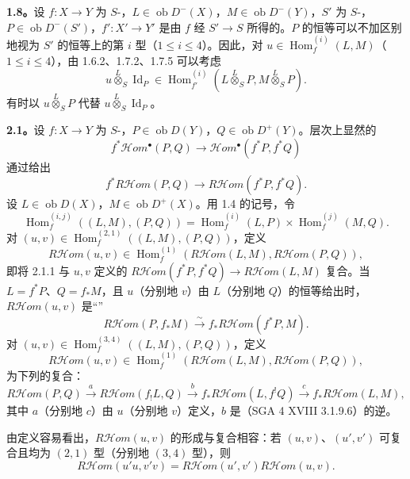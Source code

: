 \textbf{1.8。}设 $f:X\to Y$ 为 $S$-，$L\in\operatorname{ob}D^-(X)$，$M\in\operatorname{ob}D^-(Y)$，$S'$ 为 $S$-，$P\in\operatorname{ob}D^-(S')$，$f':X'\to Y'$ 是由 $f$ 经 $S'\to S$ 所得的。$P$ 的恒等可以不加区别地视为 $S'$ 的恒等上的第 $i$ 型（$1\le i\le4$）。因此，对 $u\in\operatorname{Hom}^{(i)}_f(L,M)$（$1\le i\le4$），由 1.6.2、1.7.2、1.7.5 可以考虑
\[
u\mathbin{\overset L\otimes}_S\operatorname{Id}_P\in
\operatorname{Hom}^{(i)}_{f'}(L\mathbin{\overset L\otimes}_S P,M\mathbin{\overset L\otimes}_S P).\tag{1.8.1}
\]
有时以 $u\mathbin{\overset L\otimes}_S P$ 代替 $u\mathbin{\overset L\otimes}_S\operatorname{Id}_P$。

\textbf{2.1。}设 $f:X\to Y$ 为 $S$-，$P\in\operatorname{ob}D(Y)$，$Q\in\operatorname{ob}D^+(Y)$。层次上显然的
\[
f^*\mathcal Hom^\bullet(P,Q)\longrightarrow\mathcal Hom^\bullet(f^*P,f^*Q)
\]
通过给出
\[
f^*R\mathcal Hom(P,Q)\longrightarrow R\mathcal Hom(f^*P,f^*Q).\tag{2.1.1}
\]
设 $L\in\operatorname{ob}D(X)$，$M\in\operatorname{ob}D^+(X)$。用 1.4 的记号，令
\[
\operatorname{Hom}^{(i,j)}_f((L,M),(P,Q))=
\operatorname{Hom}^{(i)}_f(L,P)\times\operatorname{Hom}^{(j)}_f(M,Q).\tag{2.1.2}
\]
对 $(u,v)\in\operatorname{Hom}^{(2,1)}_f((L,M),(P,Q))$，定义
\[
R\mathcal Hom(u,v)\in\operatorname{Hom}^{(1)}_f(R\mathcal Hom(L,M),R\mathcal Hom(P,Q)),\tag{2.1.3}
\]
即将 2.1.1 与 $u,v$ 定义的 $R\mathcal Hom(f^*P,f^*Q)\to R\mathcal Hom(L,M)$ 复合。当 $L=f^*P$、$Q=f_*M$，且 $u$（分别地 $v$）由 $L$（分别地 $Q$）的恒等给出时，$R\mathcal Hom(u,v)$ 是“”
\[
R\mathcal Hom(P,f_*M)\xrightarrow\sim f_*R\mathcal Hom(f^*P,M).\tag{2.1.4}
\]
对 $(u,v)\in\operatorname{Hom}^{(3,4)}_f((L,M),(P,Q))$，定义
\[
R\mathcal Hom(u,v)\in\operatorname{Hom}^{(1)}_f(R\mathcal Hom(L,M),R\mathcal Hom(P,Q)),\tag{2.1.5}
\]
为下列的复合：
\[
R\mathcal Hom(P,Q)\xrightarrow a R\mathcal Hom(f_!L,Q)
\xrightarrow b f_*R\mathcal Hom(L,f^!Q)
\xrightarrow c f_*R\mathcal Hom(L,M),
\]
其中 $a$（分别地 $c$）由 $u$（分别地 $v$）定义，$b$ 是（SGA 4 XVIII 3.1.9.6）的逆。

由定义容易看出，$R\mathcal Hom(u,v)$ 的形成与复合相容：若 $(u,v)$、$(u',v')$ 可复合且均为 $(2,1)$ 型（分别地 $(3,4)$ 型），则
\[
R\mathcal Hom(u'u,v'v)=R\mathcal Hom(u',v')R\mathcal Hom(u,v).\tag{2.1.6}
\]

